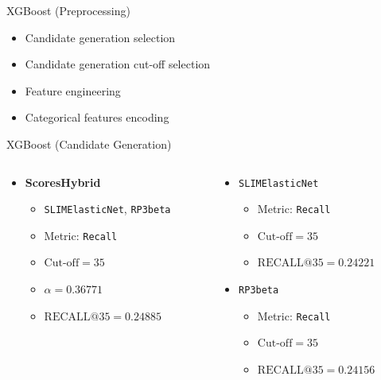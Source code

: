 \documentclass{beamer}
\begin{document}
\begin{frame}{XGBoost (Preprocessing)}
  \begin{itemize}
    \item Candidate generation selection
    \item Candidate generation cut-off selection
    \item Feature engineering
    \item Categorical features encoding
  \end{itemize}
\end{frame}

\begin{frame}{XGBoost (Candidate Generation)}
  \begin{columns}[t]
    \begin{column}{0.5\textwidth}
      \begin{itemize}
        \item \textbf{ScoresHybrid}
        \begin{itemize}
          \item \texttt{SLIMElasticNet}, \texttt{RP3beta}
          \item Metric: \texttt{Recall}
          \item $\text{Cut-off}=35$
          \item $\alpha=0.36771$
          \item $\text{RECALL@}35=0.24885$
        \end{itemize}
      \end{itemize}
    \end{column}

    \begin{column}{0.5\textwidth}
      \begin{itemize}
        \item \texttt{SLIMElasticNet}
        \begin{itemize}
          \item Metric: \texttt{Recall}
          \item $\text{Cut-off}=35$
          \item $\text{RECALL@}35=0.24221$
        \end{itemize}
        \item \texttt{RP3beta}
        \begin{itemize}
          \item Metric: \texttt{Recall}
          \item $\text{Cut-off}=35$
          \item $\text{RECALL@}35=0.24156$
        \end{itemize}
      \end{itemize}
    \end{column}
  \end{columns}
\end{frame}
\end{document}
